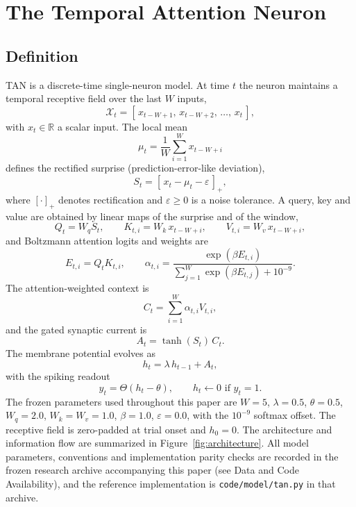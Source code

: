 \section{The Temporal Attention Neuron}\label{sec:model}

\subsection{Definition}\label{sec:model-def}

TAN is a discrete-time single-neuron model.  At time $t$ the neuron
maintains a temporal receptive field over the last $W$ inputs,
\begin{equation}
  \mathcal{X}_t = [\,x_{t-W+1},\,x_{t-W+2},\,\dots,\,x_t\,],
\end{equation}
with $x_t \in \mathbb{R}$ a scalar input.  The local mean
\begin{equation}
  \mu_t = \frac{1}{W}\sum_{i=1}^{W} x_{t-W+i}
\end{equation}
defines the rectified surprise (prediction-error-like deviation),
\begin{equation}
  S_t = [\,x_t - \mu_t - \varepsilon\,]_+,
\end{equation}
where $[\cdot]_+$ denotes rectification and $\varepsilon \geq 0$ is a
noise tolerance.  A query, key and value are obtained by linear maps of
the surprise and of the window,
\begin{equation}
  Q_t = W_q S_t, \qquad K_{t,i} = W_k\,x_{t-W+i}, \qquad
  V_{t,i} = W_v\,x_{t-W+i},
\end{equation}
and Boltzmann attention logits and weights are
\begin{equation}
  E_{t,i} = Q_t K_{t,i}, \qquad
  \alpha_{t,i} = \frac{\exp(\beta E_{t,i})}
  {\sum_{j=1}^{W}\exp(\beta E_{t,j}) + 10^{-9}} .
\end{equation}
The attention-weighted context is
\begin{equation}
  C_t = \sum_{i=1}^{W} \alpha_{t,i} V_{t,i},
\end{equation}
and the gated synaptic current is
\begin{equation}
  A_t = \tanh(S_t)\,C_t .
\end{equation}
The membrane potential evolves as
\begin{equation}
  h_t = \lambda\, h_{t-1} + A_t ,
\end{equation}
with the spiking readout
\begin{equation}
  y_t = \Theta(h_t - \theta), \qquad h_t \leftarrow 0 \text{ if }
  y_t = 1 .
\end{equation}
The frozen parameters used throughout this paper are
$W = 5$, $\lambda = 0.5$, $\theta = 0.5$, $W_q = 2.0$, $W_k = W_v = 1.0$,
$\beta = 1.0$, $\varepsilon = 0.0$, with the $10^{-9}$ softmax offset.
The receptive field is zero-padded at trial onset and $h_0 = 0$.  The
architecture and information flow are summarized in
Figure~\ref{fig:architecture}.  All model parameters, conventions and
implementation parity checks are recorded in the frozen research archive
accompanying this paper (see Data and Code Availability), and the
reference implementation is \texttt{code/model/tan.py} in that archive.


